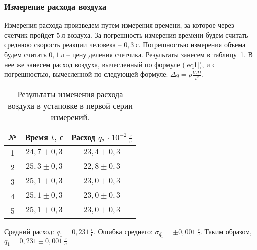 \documentclass[a4paper,11pt]{article}
\begin{document}
\subsubsection{Измерение расхода воздуха}
Измерения расхода произведем путем измерения времени, за которое через счетчик пройдет $5\ л$ воздуха.\newline
За погрешность измерения времени будем считать среднюю скорость реакции человека -- $0,3\ с$.\newline
Погрешностью измерения объема будем считать $0,1\ л$ -- цену деления счетчика.\newline
Результаты занесем в таблицу~\ref{table:tab1}.\newline
В нее же занесем расход воздуха, вычесленный по формуле (\ref{eq1}), и с погрешностью, вычесленной по следующей формуле: $\Delta q = \rho \frac{V \Delta t}{t^{2}}$.
\begin{table}[h!]
\centering
\begin{tabular}{ ||c|c|c|| }
  \hline
  № & Время $t$, $с$ & Расход $q$, $\cdot\ 10^{-2}\ \frac{г}{с}$ \\
  \hline
  1 & $24,7 \pm 0,3$ & $23,4 \pm 0,3$ \\
  2 & $25,3 \pm 0,3$ & $22,8 \pm 0,3$ \\
  3 & $25,1 \pm 0,3$ & $23,0 \pm 0,3$ \\
  4 & $25,1 \pm 0,3$ & $23,0 \pm 0,3$ \\
  5 & $25,1 \pm 0,3$ & $23,0 \pm 0,3$ \\
  \hline
\end{tabular}
\caption{Результаты изменения расхода воздуха в установке в первой серии измерений.}
\label{table:tab1}
\end{table}
\newline
Средний расход: $\overline{q_{1}} = 0,231\ \frac{г}{с}$.\newline
Ошибка среднего: $\sigma_{\overline{q_{1}}} = \pm 0,001\ \frac{г}{с}$.\newline
Таким образом, $q_{1} = 0,231 \pm 0,001\ \frac{г}{c}$
\end{document}
